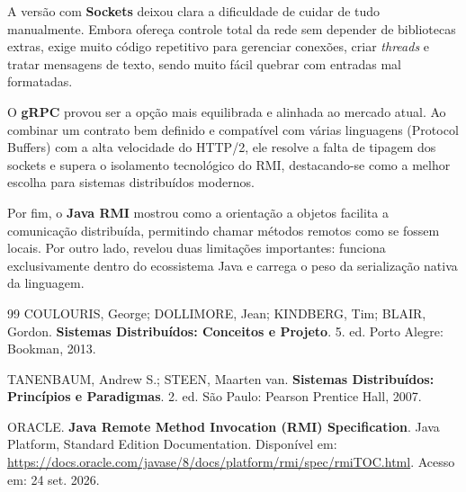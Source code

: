 \documentclass[12pt, a4paper]{article}
\begin{document}
A versão com \textbf{Sockets} deixou clara a dificuldade de cuidar de tudo manualmente. Embora ofereça controle total da rede sem depender de bibliotecas extras, exige muito código repetitivo para gerenciar conexões, criar \textit{threads} e tratar mensagens de texto, sendo muito fácil quebrar com entradas mal formatadas.

O \textbf{gRPC} provou ser a opção mais equilibrada e alinhada ao mercado atual. Ao combinar um contrato bem definido e compatível com várias linguagens (Protocol Buffers) com a alta velocidade do HTTP/2, ele resolve a falta de tipagem dos sockets e supera o isolamento tecnológico do RMI, destacando-se como a melhor escolha para sistemas distribuídos modernos.

Por fim, o \textbf{Java RMI} mostrou como a orientação a objetos facilita a comunicação distribuída, permitindo chamar métodos remotos como se fossem locais. Por outro lado, revelou duas limitações importantes: funciona exclusivamente dentro do ecossistema Java e carrega o peso da serialização nativa da linguagem.


\newpage
\begin{thebibliography}{99}
    COULOURIS, George; DOLLIMORE, Jean; KINDBERG, Tim; BLAIR, Gordon. \textbf{Sistemas Distribuídos: Conceitos e Projeto}. 5. ed. Porto Alegre: Bookman, 2013.

    TANENBAUM, Andrew S.; STEEN, Maarten van. \textbf{Sistemas Distribuídos: Princípios e Paradigmas}. 2. ed. São Paulo: Pearson Prentice Hall, 2007.

    ORACLE. \textbf{Java Remote Method Invocation (RMI) Specification}. Java Platform, Standard Edition Documentation. Disponível em: \url{https://docs.oracle.com/javase/8/docs/platform/rmi/spec/rmiTOC.html}. Acesso em: 24 set. 2026.

\end{thebibliography}
\end{document}
